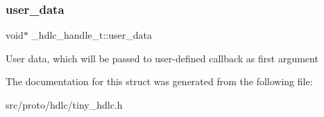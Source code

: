 \subsubsection{\texorpdfstring{user\+\_\+data}{user\_data}}
{\footnotesize\ttfamily void$\ast$ \+\_\+hdlc\+\_\+handle\+\_\+t\+::user\+\_\+data}

User data, which will be passed to user-\/defined callback as first argument 

The documentation for this struct was generated from the following file\+:\begin{DoxyCompactItemize}
\item 
src/proto/hdlc/tiny\+\_\+hdlc.\+h\end{DoxyCompactItemize}
